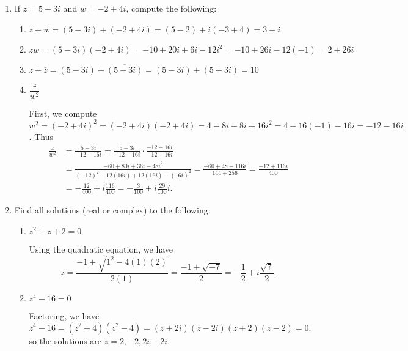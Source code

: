 \documentclass[12pt]{article}
\begin{document}
\thispagestyle{fancy}

 \begin{enumerate}
 \item  If $z=5-3i$ and $w=-2+4i$, compute the following:
\begin{enumerate}
 \item $z+w = (5-3i)+(-2+4i) = (5-2)+i(-3+4) = 3+i$

\vspace{2cm}

 \item $zw = (5-3i)(-2+4i) = -10+20i+6i-12i^2 = -10+26i-12(-1) = 2+26i$

\vspace{2cm}

 \item $z+\overline{z} = (5-3i) + \overline{(5-3i)} = (5-3i) + (5+3i) = 10$

\vspace{2cm}

 \item $\dfrac{z}{w^2}$

\medskip

First, we compute $w^2 = (-2+4i)^2 = (-2+4i)(-2+4i) = 4-8i-8i+16i^2 = 4+16(-1)-16i = -12-16i$. Thus
\begin{align*}
 \frac{z}{w^2} &= \frac{5-3i}{-12-16i} = \frac{5-3i}{-12-16i}\cdot \frac{-12+16i}{-12+16i}\\
& = \frac{-60+80i+36i-48i^2}{(-12)^2-12(16i)+12(16i)-(16i)^2} = \frac{-60+48+116i}{144+256} = \frac{-12+116i}{400}\\
& = -\frac{12}{400}+i\frac{116}{400} = -\frac{3}{100}+i\frac{29}{100}i.
\end{align*}

\end{enumerate}

 \item Find all solutions (real or complex) to the following:
\begin{enumerate}
 \item $z^2+z+2=0$

Using the quadratic equation, we have
\[
 z = \frac{-1\pm\sqrt{1^2-4(1)(2)}}{2(1)} = \frac{-1\pm\sqrt{-7}}{2} = -\frac{1}{2}+i\frac{\sqrt{7}}{2}.
\]


 \item $z^4-16=0$

Factoring, we have
\[
 z^4-16 = (z^2+4)(z^2-4) = (z+2i)(z-2i)(z+2)(z-2)=0,
\]
so the solutions are $z=2, -2, 2i, -2i$.
\end{enumerate}
\newpage


\end{enumerate}
\end{document}
